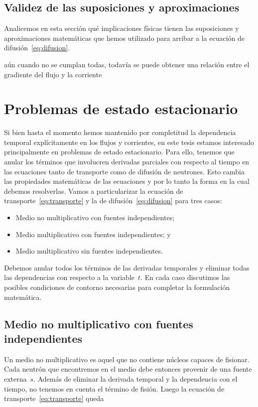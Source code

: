 \subsection{Validez de las suposiciones y aproximaciones} %

Analicemos en esta sección qué implicaciones físicas tienen las suposiciones y aproximaciones matemáticas que hemos utilizado para arribar a la ecuación de difusión~\eqref{eq:difusion}. 

{\color{red} aún cuando no se cumplan todas, todavía se puede obtener una relación entre el gradiente del flujo y la corriente}


\section{Problemas de estado estacionario} %
\label{sec:problemas}

Si bien hasta el momento hemos mantenido por completitud la dependencia temporal explícitamente en los flujos y corrientes, en este tesis estamos interesado principalmente en problemas de estado estacionario. Para ello, tenemos que anular los términos que involucren derivadas parciales con respecto al tiempo en las ecuaciones tanto de transporte como de difusión de neutrones. Esto cambia las propiedades matemáticas de las ecuaciones y por lo tanto la forma en la cual debemos resolverlas. Vamos a particularizar la ecuación de transporte~\eqref{eq:transporte} y la de difusión~\eqref{eq:difusion} para tres casos:

\begin{itemize}
 \item Medio no multiplicativo con fuentes independientes;
 \item Medio multiplicativo con fuentes independientes; y
 \item Medio multiplicativo sin fuentes independientes.
\end{itemize}

Debemos anular todos los términos de las derivadas temporales y eliminar todas las dependencias con respecto a la variable~$t$.
En cada caso discutimos las posibles condiciones de contorno necesarias para completar la formulación matemática.


\subsection{Medio no multiplicativo con fuentes independientes} %

Un medio no multiplicativo es aquel que no contiene núcleos capaces de fisionar. Cada neutrón que encontremos en el medio debe entonces provenir de una fuente externa~$s$. Además de eliminar la derivada temporal y la dependencia con el tiempo, no tenemos en cuenta el término de fisión. Luego la ecuación de transporte~\eqref{eq:transporte} queda

